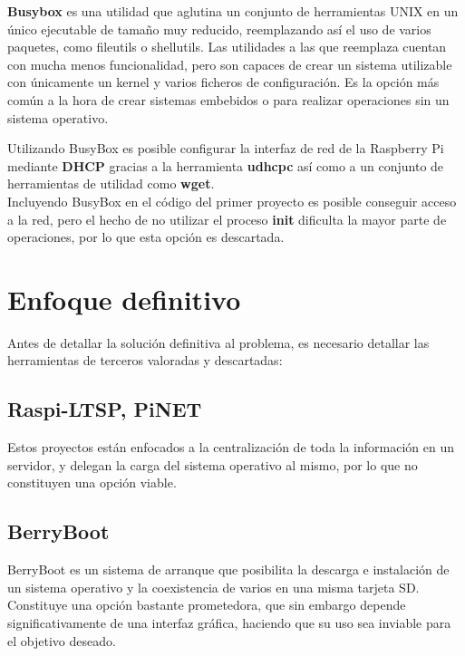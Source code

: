 \documentclass{article}
\begin{document}
\textbf{Busybox} es una utilidad que aglutina un conjunto de herramientas UNIX en un único ejecutable de tamaño muy reducido, reemplazando así el uso de varios paquetes, como fileutils o shellutils. Las utilidades a las que reemplaza cuentan con mucha menos funcionalidad, pero son capaces de crear un sistema utilizable con únicamente un kernel y varios ficheros de configuración\cite{aboutbusybox}. Es la opción más común a la hora de crear sistemas embebidos o para realizar operaciones sin un sistema operativo.

Utilizando BusyBox es posible configurar la interfaz de red de la Raspberry Pi mediante \textbf{DHCP} gracias a la herramienta \textbf{udhcpc} así como a un conjunto de herramientas de utilidad como \textbf{wget}.\\

Incluyendo BusyBox en el código del primer proyecto es posible conseguir acceso a la red, pero el hecho de no utilizar el proceso \textbf{init} dificulta la mayor parte de operaciones, por lo que esta opción es descartada.

\section{Enfoque definitivo}

Antes de detallar la solución definitiva al problema, es necesario detallar las herramientas de terceros valoradas y descartadas:

\subsection*{Raspi-LTSP, PiNET}

Estos proyectos\cite{raspiltsp, pinet} están enfocados a la centralización de toda la información en un servidor, y delegan la carga del sistema operativo al mismo, por lo que no constituyen una opción viable.

\subsection*{BerryBoot}

BerryBoot\cite{berryboot} es un sistema de arranque que posibilita la descarga e instalación de un sistema operativo y la coexistencia de varios en una misma tarjeta SD. Constituye una opción bastante prometedora, que sin embargo depende significativamente de una interfaz gráfica, haciendo que su uso sea inviable para el objetivo deseado.
\end{document}
